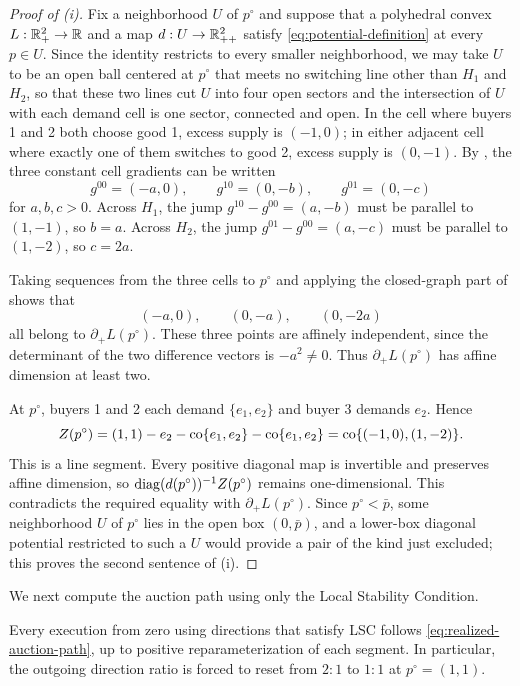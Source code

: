 \begin{proof}[Proof of (i)]
Fix a neighborhood $U$ of $p^\circ$ and suppose that a polyhedral convex $L:\mathbb{R}_+^2\to\mathbb{R}$ and a map $d:U\to\mathbb{R}_{++}^2$ satisfy \eqref{eq:potential-definition} at every $p\in U$. Since the identity restricts to every smaller neighborhood, we may take $U$ to be an open ball centered at $p^\circ$ that meets no switching line other than $H_1$ and $H_2$, so that these two lines cut $U$ into four open sectors and the intersection of $U$ with each demand cell is one sector, connected and open. In the cell where buyers 1 and 2 both choose good 1, excess supply is $(-1,0)$; in either adjacent cell where exactly one of them switches to good 2, excess supply is $(0,-1)$. By , the three constant cell gradients can be written
\[
g^{00}=(-a,0),\qquad
g^{10}=(0,-b),\qquad
g^{01}=(0,-c)
\]
for $a,b,c>0$. Across $H_1$, the jump $g^{10}-g^{00}=(a,-b)$ must be parallel to $(1,-1)$, so $b=a$. Across $H_2$, the jump $g^{01}-g^{00}=(a,-c)$ must be parallel to $(1,-2)$, so $c=2a$.

Taking sequences from the three cells to $p^\circ$ and applying the closed-graph part of  shows that
\[
(-a,0),\qquad(0,-a),\qquad(0,-2a)
\]
all belong to $\partial_+L(p^\circ)$. These three points are affinely independent, since the determinant of the two difference vectors is $-a^2\ne0$. Thus $\partial_+L(p^\circ)$ has affine dimension at least two.

At $p^\circ$, buyers 1 and 2 each demand $\{e_1,e_2\}$ and buyer 3 demands $e_2$. Hence
\begin{equation}\label{eq:path-Z-turn}
Z(p^\circ)
=(1,1)-e_2-\operatorname{co}\{e_1,e_2\}-\operatorname{co}\{e_1,e_2\}
=\operatorname{co}\{(-1,0),(1,-2)\}.
\end{equation}
This is a line segment. Every positive diagonal map is invertible and preserves affine dimension, so $\operatorname{diag}(d(p^\circ))^{-1}Z(p^\circ)$ remains one-dimensional. This contradicts the required equality with $\partial_+L(p^\circ)$. Since $p^\circ<\bar p$, some neighborhood $U$ of $p^\circ$ lies in the open box $(0,\bar p)$, and a lower-box diagonal potential restricted to such a $U$ would provide a pair of the kind just excluded; this proves the second sentence of (i).
\end{proof}

We next compute the auction path using only the Local Stability Condition.

\begin{lemma}\label{lem:forced-path}
Every execution from zero using directions that satisfy LSC follows \eqref{eq:realized-auction-path}, up to positive reparameterization of each segment. In particular, the outgoing direction ratio is forced to reset from $2{:}1$ to $1{:}1$ at $p^\circ=(1,1)$.
\end{lemma}

